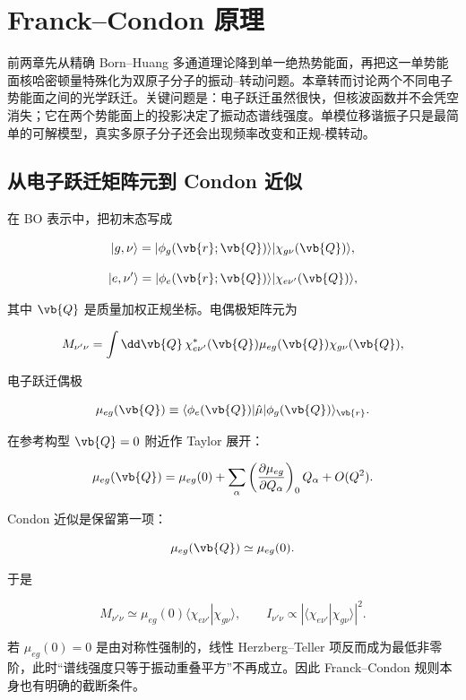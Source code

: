 \section{Franck--Condon 原理}
\label{ch:franck-condon}

前两章先从精确 Born--Huang 多通道理论降到单一绝热势能面，再把这一单势能面核哈密顿量特殊化为双原子分子的振动--转动问题。本章转而讨论两个不同电子势能面之间的光学跃迁。关键问题是：电子跃迁虽然很快，但核波函数并不会凭空消失；它在两个势能面上的投影决定了振动态谱线强度。单模位移谐振子只是最简单的可解模型，真实多原子分子还会出现频率改变和正规-模转动。
\subsection{从电子跃迁矩阵元到 Condon 近似}

在 BO 表示中，把初末态写成

\[
|g,\nu\rangle
=|\phi_g(\vb{r};\vb{Q})\rangle
|\chi_{g\nu}(\vb{Q})\rangle,
\]

\[
|e,\nu'\rangle
=|\phi_e(\vb{r};\vb{Q})\rangle
|\chi_{e\nu'}(\vb{Q})\rangle,
\]

其中 \(\vb{Q}\) 是质量加权正规坐标。电偶极矩阵元为

\[
M_{\nu'\nu}
=\int\dd\vb{Q}\,
\chi_{e\nu'}^*(\vb{Q})
\mu_{eg}(\vb{Q})
\chi_{g\nu}(\vb{Q}),
\]

电子跃迁偶极

\[
\mu_{eg}(\vb{Q})
\equiv
\langle\phi_e(\vb{Q})|\hat\mu|\phi_g(\vb{Q})\rangle_{\vb{r}}.
\]

在参考构型 \(\vb{Q}=0\) 附近作 Taylor 展开：

\begin{equation}
\mu_{eg}(\vb{Q})
=\mu_{eg}(0)
+\sum_\alpha
\left(\frac{\partial\mu_{eg}}{\partial Q_\alpha}\right)_0Q_\alpha
+O(Q^2).
\label{eq:herzberg-teller-expansion}
\end{equation}

Condon 近似是保留第一项：

\[
\mu_{eg}(\vb{Q})\simeq\mu_{eg}(0).
\]

于是

\begin{equation}
M_{\nu'\nu}
\simeq
\mu_{eg}(0)
\langle\chi_{e\nu'}|\chi_{g\nu}\rangle,
\qquad
I_{\nu'\nu}\propto
|\langle\chi_{e\nu'}|\chi_{g\nu}\rangle|^2.
\label{eq:franck-condon-factor}
\end{equation}

若 \(\mu_{eg}(0)=0\) 是由对称性强制的，线性 Herzberg--Teller 项反而成为最低非零阶，此时“谱线强度只等于振动重叠平方”不再成立。因此 Franck--Condon 规则本身也有明确的截断条件。

